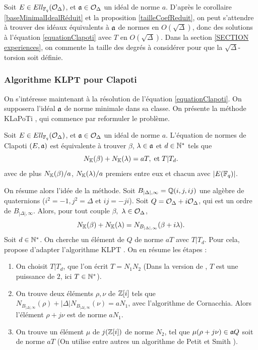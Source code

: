 \begin{Rem}\label{tailleTorsionTh}
	Soit $E\in Ell_{\mathbb{F}_{q}}(\mathcal{O}_{\Delta})$, et $\mathfrak{a}\in\mathcal{O}_{\Delta}$ un idéal de norme $a$. D'après le corollaire \ref{baseMinimalIdealRéduit} et la proposition \ref{tailleCoefReduit}, on peut s'attendre à trouver des idéaux équivalents à $\mathfrak{a}$ de normes en $O(\sqrt{\Delta})$, donc des solutions à l'équation \eqref{equationClapoti} avec $T$ en $O(\sqrt{\Delta})$. Dans la section \ref{SECTION experiences}, on commente la taille des degrés à considérer pour que la $\sqrt{\Delta}$-torsion soit définie. 
\end{Rem}

\subsubsection{Algorithme KLPT pour Clapoti}

On s'intéresse maintenant à la résolution de l'équation \eqref{equationClapoti}. On supposera l'idéal $\mathfrak{a}$ de norme minimale dans sa classe. On présente la méthode KLaPoTi \cite{KLaPoTi}, qui commence par reformuler le problème. 

\begin{Prop}
	Soit $E\in Ell_{\mathbb{F}_{q}}(\mathcal{O}_{\Delta})$, et $\mathfrak{a}\in\mathcal{O}_{\Delta}$ un idéal de norme $a$. L'équation de normes de Clapoti $(E,\mathfrak{a})$ est équivalente à trouver $\beta$, $\lambda\in\mathfrak{a}$ et $d\in\mathbb{N}^*$ tels que
	\begin{equation}\label{equationKlapoti}
		N_{\mathbb{K}}(\beta) + N_{\mathbb{K}}(\lambda) = aT,\;\mbox{et}\; T|T_d.
	\end{equation}
    avec de plus $N_{\mathbb{K}}(\beta)/a$, $N_{\mathbb{K}}(\lambda)/a$ premiers entre eux et chacun avec $|E(\mathbb{F}_{q})|$.
\end{Prop}

On résume alors l'idée de la méthode. Soit $B_{|\Delta|,\infty} = \mathbb{Q}(i,j,ij)$ une algèbre de quaternions ($i^2 = -1, j^2 = \Delta$ et $ij = -ji$). Soit $Q = \mathcal{O}_\Delta + i\mathcal{O}_{\Delta}$, qui est un ordre de $B_{|\Delta|,\infty}$. Alors, pour tout couple $\beta,$ $\lambda\in\mathcal{O}_{\Delta}$,
\begin{equation*}
	N_{\mathbb{K}}(\beta) + N_{\mathbb{K}}(\lambda) = N_{B_{|\Delta|,\infty}}(\beta + i\lambda).
\end{equation*}
Soit $d\in\mathbb{N}^*$. On cherche un élément de $Q$ de norme $aT$ avec $T|T_d$. Pour cela, \cite{KLaPoTi} propose d'adapter l'algorithme KLPT \cite{KLPT}. On en résume les étapes :

\begin{enumerate}
	\item On choisit $T|T_d$, que l'on écrit $T = N_1N_2$ (Dans la version de \cite{KLaPoTi}, $T$ est une puissance de $2$, ici $T\in\mathbb{N}^*$).
	\item On trouve deux éléments $\rho, \nu$ de $\mathbb{Z}[i]$ tels que $N_{B_{|\Delta|,\infty}}(\rho)+|\Delta|N_{B_{|\Delta|,\infty}}(\nu) = aN_1$, avec l'algorithme de Cornacchia. Alors l'élément $\rho + j\nu$ est de norme $aN_1$. 
	\item On trouve un élément $\mu$ de $j(\mathbb{Z}[i])$ de norme $N_2$, tel que $\mu(\rho + j\nu)\in \mathfrak{a} Q$ soit de norme $aT$ (On utilise entre autres un algorithme de Petit et Smith \cite{PetitSmith}).
\end{enumerate} 

